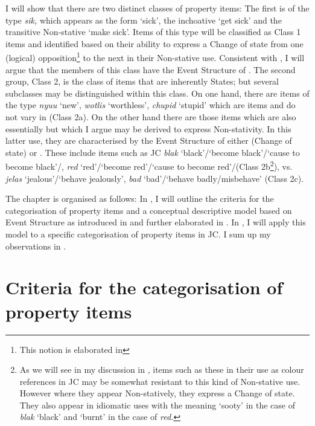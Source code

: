 I will show that there are two distinct classes of property items: The first is of the type \textit{sik,} which appears as the  form `sick', the inchoative `get sick' and the transitive Non-stative `make sick'. Items of this type will be classified as Class 1 items and identified based on their ability to express a Change of state from one (logical) opposition\footnote{This notion is elaborated in } to the next in their Non-stative use. Consistent with \citet{Pustejovsky1988,Pustejovsky1991}, I will argue that the members of this class have the Event Structure of . The second group, Class 2, is the class of items that are inherently States; but several subclasses may be distinguished within this class. On one hand, there are items of the type \textit{nyuu} `new', \textit{wotlis} `worthless', \textit{chupid} `stupid' which are  items and do not vary in  (Class 2a). On the other hand there are those items which are also essentially  but which I argue may be derived to express Non-stativity. In this latter use, they are characterised by the Event Structure of either  (Change of state) or . These include items such as JC \textit{blak} `black'\slash `become black'\slash `cause to become black'\slash, \textit{red} `red'\slash`become red'\slash`cause to become red'\slash (Class 2b\footnote{As we will see in my discussion in , items such as these in their use as colour references in JC may be somewhat resistant to this kind of Non-stative use. However where they appear Non-statively, they express a Change of state. They also appear in idiomatic uses with the meaning `sooty’ in the case of \textit{blak} `black’ and `burnt’ in the case of \textit{red.}}), vs. \textit{jelas} `jealous'\slash`behave jealously', \textit{bad} `bad'\slash`behave badly\slash misbehave' (Class 2c). 


The chapter is organised as follows: In , I will outline the criteria for the categorisation of property items and a conceptual descriptive model based on Event Structure as introduced in  and further elaborated in . In , I will apply this model to a specific categorisation of property items in JC. I sum up my observations in . 

\section{Criteria for the categorisation of property items}\label{sec:5.1}

